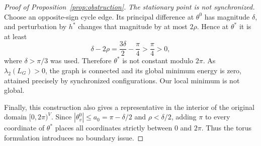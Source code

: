 \documentclass[11pt,reqno]{amsart}
\begin{document}
\begin{proof}[Proof of Proposition~\ref{prop:obstruction}]
\smallskip
\emph{The stationary point is not synchronized.}
Choose an opposite-sign cycle edge. Its principal difference at $\theta^0$ has magnitude $\delta$, and perturbation by $h^*$ changes that magnitude by at most $2\rho$. Hence at $\theta^*$ it is at least
\[
 \delta-2\rho=\frac{3\delta}{2}-\frac\pi4>\frac\pi4>0,
\]
where $\delta>\pi/3$ was used. Therefore $\theta^*$ is not constant modulo $2\pi$. As $\lambda_2(L_G)>0$, the graph is connected and its global minimum energy is zero, attained precisely by synchronized configurations. Our local minimum is not global.

Finally, this construction also gives a representative in the interior of the original domain $[0,2\pi)^V$. Since $|\theta_v^0|\le a_0=\pi-\delta/2$ and $\rho<\delta/2$, adding $\pi$ to every coordinate of $\theta^*$ places all coordinates strictly between $0$ and $2\pi$. Thus the torus formulation introduces no boundary issue.
\end{proof}











\end{document}
